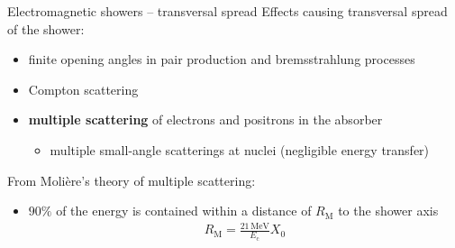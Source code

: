 \documentclass[11pt,xcolor=dvipsnames,professionalfonts]{beamer}
\begin{document}
\begin{frame}{Electromagnetic showers -- transversal spread}
	Effects causing transversal spread of the shower:
	\begin{itemize}
		\setlength\itemsep{1.em}
		\item finite opening angles in pair production and bremsstrahlung processes
		
		\item Compton scattering
		
		\item \textbf{multiple scattering}{\tiny } of electrons and positrons in the absorber
		\begin{itemize}
			\item multiple small-angle scatterings at nuclei (negligible energy transfer)
		\end{itemize}		
	\end{itemize}
	\vfill
	From Molière's theory of multiple scattering:
	\begin{itemize}
		\item $90\%$ of the energy is contained within a distance of $R_\mathrm{M}$ to the shower axis
				\begin{align*}
				R_\mathrm{M} = \frac{21\,\mathrm{MeV}}{E_\mathrm{c}} X_0
				\end{align*}
	\end{itemize}
\end{frame}

\end{document}

